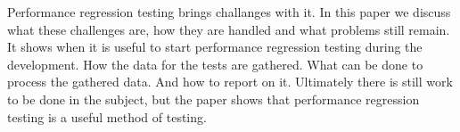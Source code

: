 Performance regression testing brings challanges with it. In this paper we discuss what these challenges are, how they are handled and what problems still remain. It shows when it is useful to start performance regression testing during the development. How the data for the tests are gathered. What can be done to process the gathered data. And how to report on it. Ultimately there is still work to be done in the subject, but the paper shows that performance regression testing is a useful method of testing.
